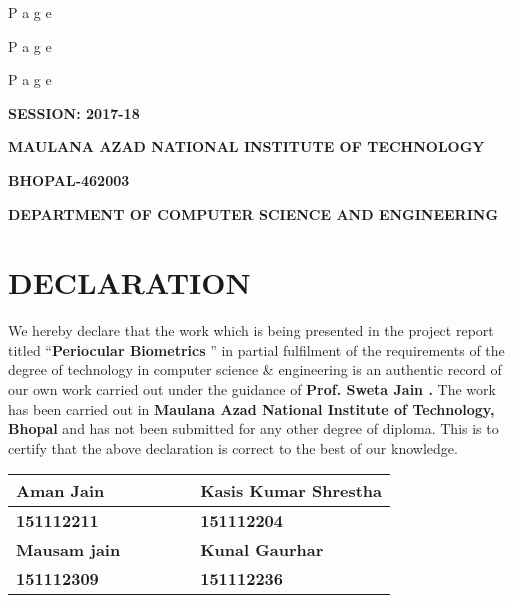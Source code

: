 \documentclass{article} %
\begin{document}


\textbf{ {\textbar} }P a g e\textbf{ }

\noindent  

\textbf{ {\textbar} }P a g e\textbf{ }

\noindent  

\textbf{ {\textbar} }P a g e\textbf{ }

\noindent  

\noindent 

\noindent \textbf{}

\noindent \textbf{SESSION: 2017-18 }

\noindent  

\noindent \textbf{MAULANA AZAD NATIONAL INSTITUTE OF TECHNOLOGY }

\noindent \textbf{BHOPAL-462003 }

\noindent \textbf{DEPARTMENT OF COMPUTER SCIENCE AND ENGINEERING }

\noindent \textbf{ }

\noindent 
\section{DECLARATION }

\noindent  

\noindent We hereby declare that the work which is being presented in the project report titled ``\textbf{Periocular Biometrics }'' in partial fulfilment of the requirements of the degree of technology in computer science \& engineering is an authentic record of our own work carried out under the guidance of \textbf{Prof. Sweta Jain .} The work has been carried out in \textbf{Maulana Azad National Institute of Technology, Bhopal} and has not been submitted for any other degree of diploma. This is to certify that the above declaration is correct to the best of our knowledge. 

\noindent  

\textbf{   }

\begin{tabular}{|p{1.1in}|p{0.4in}|p{0.4in}|p{0.4in}|p{1.1in}|p{1.1in}|} \hline 
\textbf{Aman Jain } & \textbf{ } & \textbf{ } & \textbf{ } & \textbf{          } & \textbf{Kasis Kumar Shrestha } \\ \hline 
\textbf{151112211       }\newline \textbf{ } & \textbf{ } & \textbf{ } & \textbf{ } & \textbf{     } & \textbf{151112204 } \\ \hline 
\textbf{Mausam jain } & \textbf{ } & \textbf{ } & \textbf{ } & \textbf{              } & \textbf{Kunal Gaurhar } \\ \hline 
\textbf{151112309   } & \textbf{ } & \textbf{ } & \textbf{ } & \textbf{                       } & \textbf{151112236} \\ \hline 
\end{tabular}
\end{document}
